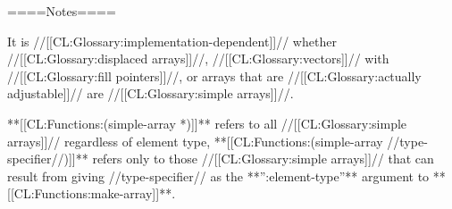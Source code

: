 ====Notes====

It is //[[CL:Glossary:implementation-dependent]]// whether //[[CL:Glossary:displaced arrays]]//, //[[CL:Glossary:vectors]]// with //[[CL:Glossary:fill pointers]]//, or arrays that are //[[CL:Glossary:actually adjustable]]// are //[[CL:Glossary:simple arrays]]//.

**[[CL:Functions:(simple-array *)]]** refers to all //[[CL:Glossary:simple arrays]]// regardless of element type, **[[CL:Functions:(simple-array //type-specifier//)]]** refers only to those //[[CL:Glossary:simple arrays]]// that can result from giving //type-specifier// as the **'':element-type''** argument to **[[CL:Functions:make-array]]**.

 
